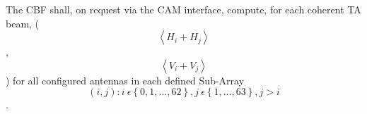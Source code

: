 The CBF shall, on request via the CAM interface, compute, for each coherent TA
beam, ($$\left \langle H_i + H_j \right \rangle$$, $$\left \langle V_i + V_j
\right \rangle $$) for all configured antennas in each defined Sub-Array
$$\left ( i,j \right ): i \: \epsilon \left \{ 0,1, ... ,62 \right \}, j \:
\epsilon \left \{ 1, ... ,63 \right \}, j > i$$.
